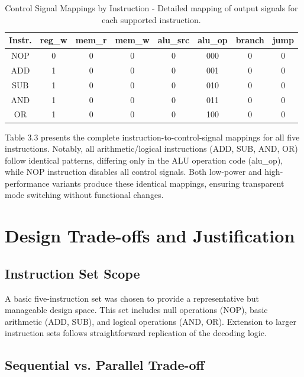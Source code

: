 \documentclass[15pt,a4paper]{report}
\begin{document}
\begin{table}[H]
    \centering
    \begin{tabular}{|c|c|c|c|c|c|c|c|}
        \hline
        \textbf{Instr.} & \textbf{reg\_w} & \textbf{mem\_r} & \textbf{mem\_w} & \textbf{alu\_src} & \textbf{alu\_op} & \textbf{branch} & \textbf{jump} \\
        \hline
        NOP & 0 & 0 & 0 & 0 & 000 & 0 & 0 \\
        \hline
        ADD & 1 & 0 & 0 & 0 & 001 & 0 & 0 \\
        \hline
        SUB & 1 & 0 & 0 & 0 & 010 & 0 & 0 \\
        \hline
        AND & 1 & 0 & 0 & 0 & 011 & 0 & 0 \\
        \hline
        OR & 1 & 0 & 0 & 0 & 100 & 0 & 0 \\
        \hline
    \end{tabular}
    \label{tab:ctrl_mappings}
    \caption{Control Signal Mappings by Instruction - Detailed mapping of output signals for each supported instruction.}
\end{table}

Table 3.3 presents the complete instruction-to-control-signal mappings for all five instructions. Notably, all arithmetic/logical instructions (ADD, SUB, AND, OR) follow identical patterns, differing only in the ALU operation code (alu\_op), while NOP instruction disables all control signals. Both low-power and high-performance variants produce these identical mappings, ensuring transparent mode switching without functional changes.

\section{Design Trade-offs and Justification}

\subsection{Instruction Set Scope}

A basic five-instruction set was chosen to provide a representative but manageable design space. This set includes null operations (NOP), basic arithmetic (ADD, SUB), and logical operations (AND, OR). Extension to larger instruction sets follows straightforward replication of the decoding logic.

\subsection{Sequential vs. Parallel Trade-off}
\end{document}

